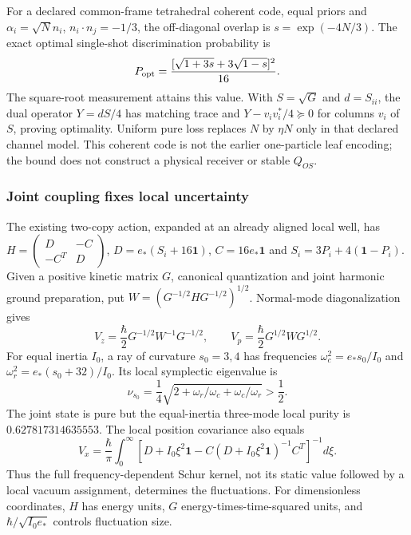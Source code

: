 \documentclass[11pt]{article}
\begin{document}
For a declared common-frame tetrahedral coherent code, equal priors and
$\alpha_i=\sqrt{N}n_i$, $n_i\cdot n_j=-1/3$, the off-diagonal overlap is
$s=\exp(-4N/3)$. The exact optimal single-shot discrimination probability is
\begin{equation}
 P_{\rm opt}=\frac{[\sqrt{1+3s}+3\sqrt{1-s}]^2}{16}.
\end{equation}
The square-root measurement attains this value. With $S=\sqrt{G}$ and
$d=S_{ii}$, the dual operator $Y=dS/4$ has matching trace and
$Y-v_iv_i^*/4\succeq0$ for columns $v_i$ of $S$, proving optimality.
Uniform pure loss replaces $N$ by $\eta N$ only in that declared channel
model. This coherent code is not the earlier one-particle leaf encoding;
the bound does not construct a physical receiver or stable $Q_{OS}$.

\subsubsection{Joint coupling fixes local uncertainty}
The existing two-copy action, expanded at an already aligned local well,
has $H=\left(\begin{smallmatrix}D&-C\\-C^T&D\end{smallmatrix}\right)$,
$D=e_*(S_i+16\mathbf1)$, $C=16e_*\mathbf1$ and
$S_i=3P_i+4(\mathbf1-P_i)$. Given a positive kinetic matrix $G$,
canonical quantization and joint harmonic ground preparation, put
$W=(G^{-1/2}HG^{-1/2})^{1/2}$. Normal-mode diagonalization gives
\begin{equation}
 V_z=\frac\hbar2G^{-1/2}W^{-1}G^{-1/2},\qquad
 V_p=\frac\hbar2G^{1/2}WG^{1/2}.
\end{equation}
For equal inertia $I_0$, a ray of curvature $s_0=3,4$ has frequencies
$\omega_c^2=e_*s_0/I_0$ and $\omega_r^2=e_*(s_0+32)/I_0$. Its local
symplectic eigenvalue is
\begin{equation}
 \nu_{s_0}=\frac14\sqrt{2+\omega_r/\omega_c+\omega_c/\omega_r}>\frac12.
\end{equation}
The joint state is pure but the equal-inertia three-mode local purity is
$0.627817314635553$. The local position covariance also equals
\begin{equation}
 V_x=\frac\hbar\pi\int_0^\infty
 \left[D+I_0\xi^2\mathbf1-C(D+I_0\xi^2\mathbf1)^{-1}C^T\right]^{-1}d\xi.
\end{equation}
Thus the full frequency-dependent Schur kernel, not its static value followed
by a local vacuum assignment, determines the fluctuations. For dimensionless
coordinates, $H$ has energy units, $G$ energy-times-time-squared units, and
$\hbar/\sqrt{I_0e_*}$ controls fluctuation size.
\end{document}
